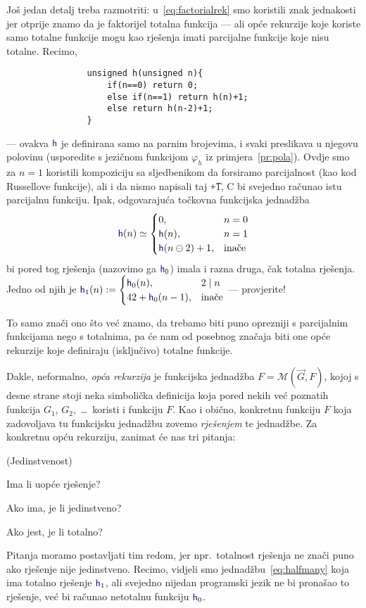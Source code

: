 Još jedan detalj treba razmotriti: u~\eqref{eq:factorialrek} smo koristili znak jednakosti jer otprije znamo da je faktorijel totalna funkcija --- ali opće rekurzije koje koriste samo totalne funkcije mogu kao rješenja imati parcijalne funkcije koje nisu totalne. Recimo,
\begin{verbatim}
                unsigned h(unsigned n){
                    if(n==0) return 0;
                    else if(n==1) return h(n)+1;
                    else return h(n-2)+1;
                }
\end{verbatim}
--- ovakva $\f h$ je definirana samo na parnim  brojevima, i svaki preslikava u njegovu polovinu (usporedite s jezičnom funkcijom $\varphi_h$ iz primjera~\ref{pr:pola}). Ovdje smo za $n=1$ koristili kompoziciju sa sljedbenikom da forsiramo parcijalnost (kao kod Russellove funkcije), ali i da nismo napisali taj \t{+1}, C bi svejedno računao istu parcijalnu funkciju. Ipak, odgovarajuća točkovna funkcijska jednadžba
\begin{equation}\label{eq:halfmany}
    \f h(n)\simeq\begin{cases}
        0,&n=0\\
        \f h(n),&n=1\\
        \f h(n\ominus2)+1,&\text{inače}
    \end{cases}
\end{equation}
bi pored tog rješenja (nazovimo ga $\f h_0$) imala i razna druga, čak totalna rješenja. Jedno od njih je
$
    \f h_1(n):=\begin{cases}
        \f h_0(n),&2\mid n\\
        42+\f h_0(n-1),&\text{inače}
    \end{cases}
$ --- provjerite!

To samo znači ono što već znamo, da trebamo biti puno oprezniji s parcijalnim funkcijama nego s totalnima, pa će nam od posebnog značaja biti one opće rekurzije koje definiraju (isključivo) totalne funkcije.

Dakle, neformalno, \emph{opća rekurzija} je funkcijska jednadžba $F=\mathcal M(\vec G,F)$, kojoj s desne strane stoji neka simbolička definicija koja pored nekih već poznatih funkcija $G_1$, $G_2$,~\ldots\ koristi i funkciju $F$. Kao i obično, konkretnu funkciju $F$ koja zadovoljava tu funkcijsku jednadžbu zovemo \emph{rješenjem} te jednadžbe. Za konkretnu opću rekurziju, zanimat će nas tri pitanja:
\begin{labeling}{(Jedinstvenost)}
    \item[(Egzistencija)] Ima li uopće rješenje?
    \item[(Jedinstvenost)] Ako ima, je li jedinstveno?
    \item[(Totalnost)] Ako jest, je li totalno?
\end{labeling}
Pitanja moramo postavljati tim redom, jer npr.\ totalnost rješenja ne znači puno ako rješenje nije jedinstveno. Recimo, vidjeli smo jednadžbu~\eqref{eq:halfmany} koja ima totalno rješenje $\f h_1$, ali svejedno nijedan programski jezik ne bi pronašao to rješenje, već bi računao netotalnu funkciju $\f h_0$.

